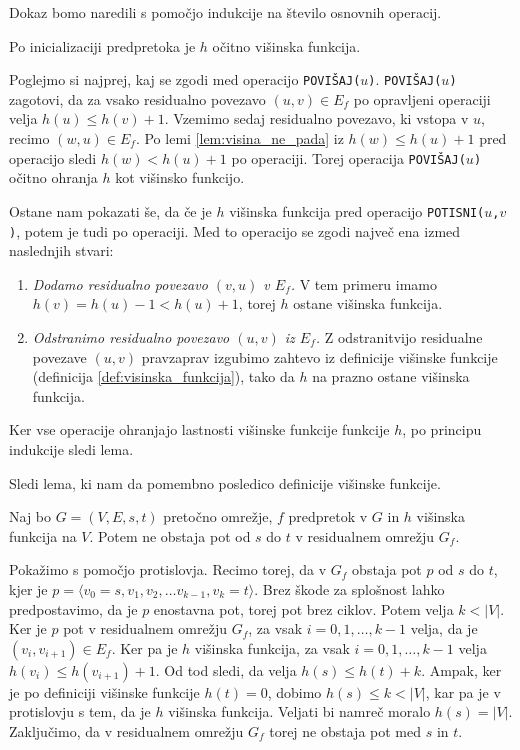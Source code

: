 \documentclass[mat1]{fmfdelo}
\begin{document}
\begin{dokaz}
Dokaz bomo naredili s pomočjo indukcije na število osnovnih operacij.

Po inicializaciji predpretoka je $h$ očitno višinska funkcija.

Poglejmo si najprej, kaj se zgodi med operacijo \texttt{POVIŠAJ($u$)}. \texttt{POVIŠAJ($u$)} zagotovi, da za vsako residualno povezavo $(u,v) \in E_f$ po opravljeni operaciji velja $h(u) \leq h(v) +1$. Vzemimo sedaj residualno povezavo, ki vstopa v $u$, recimo $(w,u) \in E_f$. Po lemi \ref{lem:visina_ne_pada} iz $h(w) \leq h(u) + 1$ pred operacijo sledi $h(w) < h(u) + 1$ po operaciji. Torej operacija \texttt{POVIŠAJ($u$)} očitno ohranja $h$ kot višinsko funkcijo.

Ostane nam pokazati še, da če je $h$ višinska funkcija pred operacijo \texttt{POTISNI($u$,$v$)}, potem je tudi po operaciji. Med to operacijo se zgodi največ ena izmed naslednjih stvari:

\begin{enumerate}
\item \textit{Dodamo residualno povezavo $(v,u)$ v $E_f$.} V tem primeru imamo $h(v) = h(u) - 1 < h(u) + 1$, torej $h$ ostane višinska funkcija.
\item \textit{Odstranimo residualno povezavo $(u,v)$ iz $E_f$.} Z odstranitvijo residualne povezave $(u,v)$ pravzaprav izgubimo zahtevo iz definicije višinske funkcije (definicija \ref{def:visinska_funkcija}), tako da $h$ na prazno ostane višinska funkcija.
\end{enumerate}

Ker vse operacije ohranjajo lastnosti višinske funkcije funkcije $h$, po principu indukcije sledi lema.
\end{dokaz}

Sledi lema, ki nam da pomembno posledico definicije višinske funkcije.

\begin{lema}\label{lem:ni_poti}
Naj bo $G=(V,E,s,t)$ pretočno omrežje, $f$ predpretok v $G$ in $h$ višinska funkcija na $V$. Potem ne obstaja pot od $s$ do $t$ v residualnem omrežju $G_f$.
\end{lema}

\begin{dokaz}
Pokažimo s pomočjo protislovja. Recimo torej, da v $G_f$ obstaja pot $p$ od $s$ do $t$, kjer je $p = \langle v_0 = s, v_1, v_2, \dotsc v_{k-1}, v_k = t\rangle$. Brez škode za splošnost lahko predpostavimo, da je $p$ enostavna pot, torej pot brez ciklov. Potem velja $k < |V|$. Ker je $p$ pot v residualnem omrežju $G_f$, za vsak $i = 0, 1, \dotsc, k-1$ velja, da je $(v_i, v_{i+1}) \in E_f$. Ker pa je $h$ višinska funkcija, za vsak $i = 0, 1, \dotsc, k-1$ velja $h(v_i) \leq h(v_{i+1}) + 1$. Od tod sledi, da velja $h(s) \leq h(t) + k$. Ampak, ker je po definiciji višinske funkcije $h(t) = 0$, dobimo $h(s) \leq k < |V|$, kar pa je v protislovju s tem, da je $h$ višinska funkcija. Veljati bi namreč moralo $h(s) = |V|$. Zaključimo, da v residualnem omrežju $G_f$ torej ne obstaja pot med $s$ in $t$.
\end{dokaz}
\end{document}
